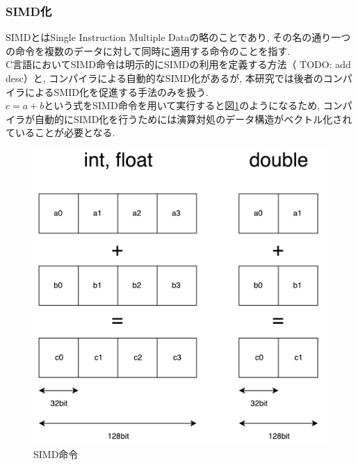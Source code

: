\subsubsection{SIMD化}
SIMDとはSingle Instruction Multiple Dataの略のことであり, その名の通り一つの命令を複数のデータに対して同時に適用する命令のことを指す.\\
C言語においてSIMD命令は明示的にSIMDの利用を定義する方法（ TODO: add desc）と, コンパイラによる自動的なSIMD化があるが,
本研究では後者のコンパイラによるSMID化を促進する手法のみを扱う.\\
$c = a + b$という式をSIMD命令を用いて実行すると図\ref{fig:simd-image}のようになるため,
コンパイラが自動的にSIMD化を行うためには演算対処のデータ構造がベクトル化されていることが必要となる.\\
\begin{figure}[h!]
    \includegraphics[width=1.1\textwidth]{./images/SIMD.pdf}
    \caption{SIMD命令}
    \label{fig:simd-image}
\end{figure}~\\

